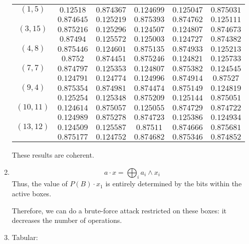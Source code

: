 \begin{enumerate}[label=\textbf{\arabic*})]
    \begin{tabular}{|c|ccccc|}
        \hline
        $(1, 5)$ & $0.12518$ & $0.874367$ & $0.124699$ & $0.125047$ & $0.875031$\\
            & $0.874645$ & $0.125219$ & $0.875393$ & $0.874762$ & $0.125111$\\
        \hline
        $(3, 15)$ & $0.875216$ & $0.125296$ & $0.124507$ & $0.124807$ & $0.874673$\\
            & $0.87494$ & $0.125572$ & $0.125003$ & $0.124727$ & $0.874382$\\
        \hline
        $(4, 8)$ & $0.875446$ & $0.124601$ & $0.875135$ & $0.874933$ & $0.125213$\\
            & $0.8752$ & $0.874451$ & $0.875246$ & $0.124821$ & $0.125733$\\
            \hline
        $(7, 7)$ & $0.874797$ & $0.125353$ & $0.124807$ & $0.875382$ & $0.124545$\\
            & $0.124791$ & $0.124774$ & $0.124996$ & $0.874914$ & $0.87527$\\
            \hline
        $(9, 4)$ & $0.875354$ & $0.874981$ & $0.874474$ & $0.875149$ & $0.124819$\\
            & $0.125254$ & $0.125348$ & $0.875209$ & $0.125144$ & $0.875051$\\
            \hline
        $(10, 11)$ & $0.124614$ & $0.875057$ & $0.125055$ & $0.874729$ & $0.874722$\\
            & $0.124989$ & $0.875278$ & $0.874723$ & $0.125386$ & $0.124934$\\
            \hline
        $(13, 12)$ & $0.124509$ & $0.125587$ & $0.87511$ & $0.874666$ & $0.875681$\\
            & $0.875177$ & $0.124752$ & $0.874682$ & $0.875346$ & $0.874852$\\
        \hline
    \end{tabular}

    These results are coherent.

    \item
    \[a\cdot x = \bigoplus_i a_i \wedge x_i\]
    Thus, the value of $P(B) \cdot x_1$ is entirely determined by the bits within the active boxes.

    Therefore, we can do a brute-force attack restricted on these boxes: it decreases the number of operations.

    \item Tabular:


\end{enumerate}
